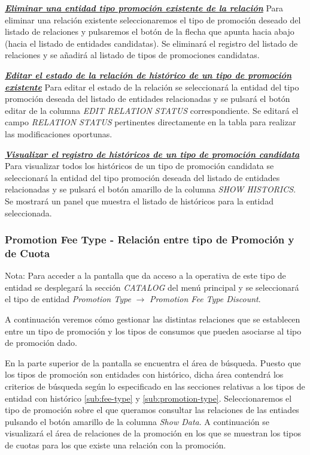 \underline{\textsl{\textbf{Eliminar una entidad tipo promoción existente de la relación}}}\newline
Para eliminar una relación existente seleccionaremos el tipo de promoción deseado del listado de relaciones y pulsaremos el botón de la flecha que apunta hacia abajo (hacia el listado de entidades candidatas). Se eliminará el registro del listado de relaciones y se añadirá al listado de tipos de promociones candidatas.


\underline{\textsl{\textbf{Editar el estado de la relación de histórico de un tipo de promoción existente}}}
Para editar el estado de la relación se seleccionará la entidad del tipo promoción  deseada del listado de entidades relacionadas y se pulsará el botón editar de la columna \textit{EDIT RELATION STATUS} correspondiente. Se editará el campo \emph{RELATION STATUS}  pertinentes directamente en la tabla para realizar las modificaciones oportunas.

\underline{\textsl{\textbf{Visualizar el registro de históricos de un tipo de promoción candidata}}}
Para visualizar todos los históricos de un tipo de promoción candidata se seleccionará la entidad del tipo promoción deseada del listado de entidades relacionadas y se pulsará el botón amarillo de la columna \textit{SHOW HISTORICS}. Se mostrará un panel que muestra el listado de históricos para la entidad seleccionada. 


\subsubsection{Promotion Fee Type - Relación entre tipo de Promoción y de Cuota}
\label{sub:promotion-fee-type-relation}

Nota: Para acceder a la pantalla que da acceso a la operativa de este tipo de entidad se desplegará la sección \emph{CATALOG} del menú principal y se seleccionará el tipo de entidad \emph{Promotion Type} $\rightarrow$  \emph{Promotion Fee Type Discount}.


A continuación veremos cómo gestionar las distintas relaciones que se establecen entre un tipo de promoción y los tipos de consumos que pueden asociarse al tipo de promoción dado.


En la parte superior de la pantalla se encuentra el área de búsqueda. Puesto que los tipos de promoción son entidades con histórico, dicha área contendrá los criterios de búsqueda según lo especificado en las secciones relativas a los tipos de entidad con histórico \ref{sub:fee-type} y \ref{sub:promotion-type}. 
Seleccionaremos el tipo de promoción sobre el que queramos consultar las relaciones de las entiades pulsando el botón amarillo de la columna \emph{Show Data}. A continuación se visualizará el área de relaciones de la promoción en los que se muestran los tipos de cuotas para los que existe una relación con la promoción.


